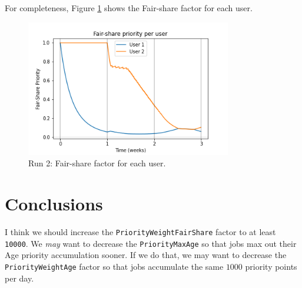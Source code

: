 \documentclass{article}
\newcommand{\code}[1]{\texttt{#1}}
\begin{document}
For completeness, Figure \ref{fig:two-fs} shows the Fair-share
factor for each user.
\begin{figure}[h!]
  \begin{center}
    \includegraphics[width=0.8\textwidth]{sim-2-fairshare}
  \end{center}
  \caption{Run 2: Fair-share factor for each user.
    \label{fig:two-fs}}
\end{figure}


\section{Conclusions}

I think we should increase the \code{PriorityWeightFairShare} factor
to at least \code{10000}.  We \emph{may} want to decrease the
\code{PriorityMaxAge} so that jobs max out their Age priority
accumulation sooner.  If we do that, we may want to decrease the
\code{PriorityWeightAge} factor so that jobs accumulate the same
$1000$ priority points per day.
\end{document}
